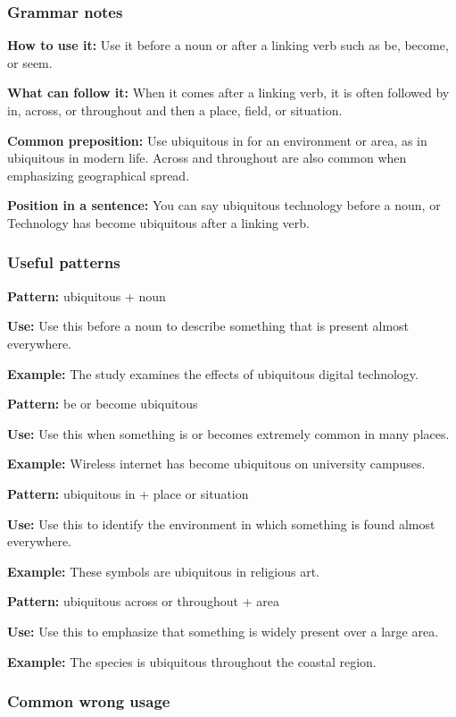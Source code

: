 \documentclass[11pt]{article}
\begin{document}
\subsubsection{Grammar notes}
\textbf{How to use it:} Use it before a noun or after a linking verb such as be, become, or seem.

\textbf{What can follow it:} When it comes after a linking verb, it is often followed by in, across, or throughout and then a place, field, or situation.

\textbf{Common preposition:} Use ubiquitous in for an environment or area, as in ubiquitous in modern life. Across and throughout are also common when emphasizing geographical spread.

\textbf{Position in a sentence:} You can say ubiquitous technology before a noun, or Technology has become ubiquitous after a linking verb.

\subsubsection{Useful patterns}
\textbf{Pattern:} ubiquitous + noun

\textbf{Use:} Use this before a noun to describe something that is present almost everywhere.

\textbf{Example:} The study examines the effects of ubiquitous digital technology.

\textbf{Pattern:} be or become ubiquitous

\textbf{Use:} Use this when something is or becomes extremely common in many places.

\textbf{Example:} Wireless internet has become ubiquitous on university campuses.

\textbf{Pattern:} ubiquitous in + place or situation

\textbf{Use:} Use this to identify the environment in which something is found almost everywhere.

\textbf{Example:} These symbols are ubiquitous in religious art.

\textbf{Pattern:} ubiquitous across or throughout + area

\textbf{Use:} Use this to emphasize that something is widely present over a large area.

\textbf{Example:} The species is ubiquitous throughout the coastal region.

\subsubsection{Common wrong usage}
\end{document}
